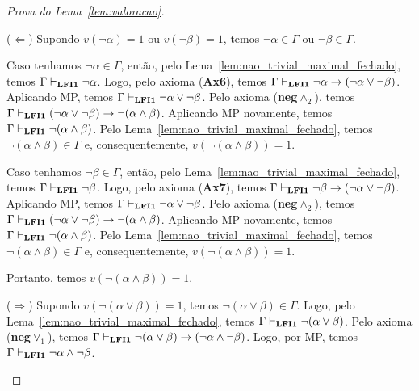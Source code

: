 \begin{proof}[Prova do Lema~\ref{lem:valoracao}]
\begin{provaporcasos}
\begin{adjustwidth}{1cm}{}
                            \noindent ($\Longleftarrow$) Supondo $v(\neg \alpha) = 1$ ou $v(\neg \beta) = 1$, temos $\neg \alpha \in \Gamma$ ou $\neg \beta \in \Gamma$.

                            \noindent Caso tenhamos $\neg \alpha \in \Gamma$, então, pelo Lema~\ref{lem:nao_trivial_maximal_fechado}, temos $\Gamma \vdash_{{\normalfont\textbf{LFI1}}{}} \neg \alpha$. Logo, pelo axioma (\textbf{Ax6}), temos $\Gamma \vdash_{{\normalfont\textbf{LFI1}}{}} \neg \alpha \to (\neg \alpha \lor \neg \beta)$. Aplicando MP, temos $\Gamma \vdash_{{\normalfont\textbf{LFI1}}{}} \neg \alpha \lor \neg \beta$. Pelo axioma (\textbf{neg}$\land_2$), temos $\Gamma \vdash_{{\normalfont\textbf{LFI1}}{}} (\neg \alpha \lor \neg \beta) \to \neg (\alpha \land \beta)$. Aplicando MP novamente, temos $\Gamma \vdash_{{\normalfont\textbf{LFI1}}{}} \neg (\alpha \land \beta)$. Pelo Lema~\ref{lem:nao_trivial_maximal_fechado}, temos $\neg (\alpha \land \beta) \in \Gamma$ e, consequentemente, $v(\neg (\alpha \land \beta)) = 1$.

                            \noindent Caso tenhamos $\neg \beta \in \Gamma$, então, pelo Lema~\ref{lem:nao_trivial_maximal_fechado}, temos $\Gamma \vdash_{{\normalfont\textbf{LFI1}}{}} \neg \beta$. Logo, pelo axioma (\textbf{Ax7}), temos $\Gamma \vdash_{{\normalfont\textbf{LFI1}}{}} \neg \beta \to (\neg \alpha \lor \neg \beta)$. Aplicando MP, temos $\Gamma \vdash_{{\normalfont\textbf{LFI1}}{}} \neg \alpha \lor \neg \beta$. Pelo axioma (\textbf{neg}$\land_2$), temos $\Gamma \vdash_{{\normalfont\textbf{LFI1}}{}} (\neg \alpha \lor \neg \beta) \to \neg (\alpha \land \beta)$. Aplicando MP novamente, temos $\Gamma \vdash_{{\normalfont\textbf{LFI1}}{}} \neg (\alpha \land \beta)$. Pelo Lema~\ref{lem:nao_trivial_maximal_fechado}, temos $\neg (\alpha \land \beta) \in \Gamma$ e, consequentemente, $v(\neg (\alpha \land \beta)) = 1$.

                            Portanto, temos $v(\neg (\alpha \land \beta)) = 1$.

                        \end{adjustwidth}


                        \begin{adjustwidth}{1cm}{}
                            
                            \noindent ($\Longrightarrow$) Supondo $v(\neg (\alpha \lor \beta)) = 1$, temos $\neg (\alpha \lor \beta) \in \Gamma$. Logo, pelo Lema~\ref{lem:nao_trivial_maximal_fechado}, temos $\Gamma \vdash_{{\normalfont\textbf{LFI1}}{}} \neg (\alpha \lor \beta)$. Pelo axioma (\textbf{neg}$\lor_1$), temos $\Gamma \vdash_{{\normalfont\textbf{LFI1}}{}} \neg (\alpha \lor \beta) \to (\neg \alpha \land \neg \beta)$. Logo, por MP, temos $\Gamma \vdash_{{\normalfont\textbf{LFI1}}{}} \neg \alpha \land \neg \beta$.


\end{adjustwidth}
\end{provaporcasos}
\end{proof}
